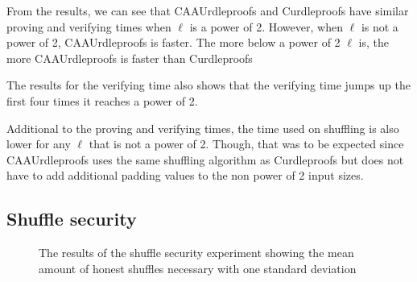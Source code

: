 From the results, we can see that CAAUrdleproofs and Curdleproofs have similar proving and verifying times when $\ell$ is a power of 2.
However, when $\ell$ is not a power of 2, CAAUrdleproofs is faster.
The more below a power of 2 $\ell$ is, the more CAAUrdleproofs is faster than Curdleproofs

The results for the verifying time also shows that the verifying time jumps up the first four times it reaches a power of 2.

Additional to the proving and verifying times, the time used on shuffling is also lower for any $\ell$ that is not a power of 2.
Though, that was to be expected since CAAUrdleproofs uses the same shuffling algorithm as Curdleproofs but does not have to add additional padding values to the non power of 2 input sizes.



\subsection{Shuffle security}\label{subsec:Shuffle-security}

\begin{figure}[!htb]
    \centering
    \qquad
    \caption{The results of the shuffle security experiment showing the mean amount of honest shuffles necessary with one standard deviation}%
    \label{fig:shufflesecurity}%
\end{figure}

